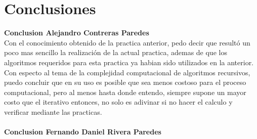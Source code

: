 \documentclass[12pt,twoside]{article}
\begin{document}
\newpage
\section{Conclusiones}
\textbf{Conclusion Alejandro Contreras Paredes}\\
Con el conocimiento obtenido de la practica anterior, pedo decir
que resultó un poco mas sencillo la realización de la actual practica, ademas de que
los algoritmos requeridos para esta practica ya habian sido utilizados en la anterior. Con especto al tema
de la complejidad computacional de algoritmos recursivos, puedo concluir que en su uso es posible que sea menos
costoso para el proceso computacional, pero al menos hasta donde entendo, siempre supone un mayor costo que el iterativo
entonces, no solo es adivinar si no hacer el calculo y verificar mediante las practicas.
\\\\
\textbf{Conclusion Fernando Daniel Rivera Paredes}\\
\end{document}
